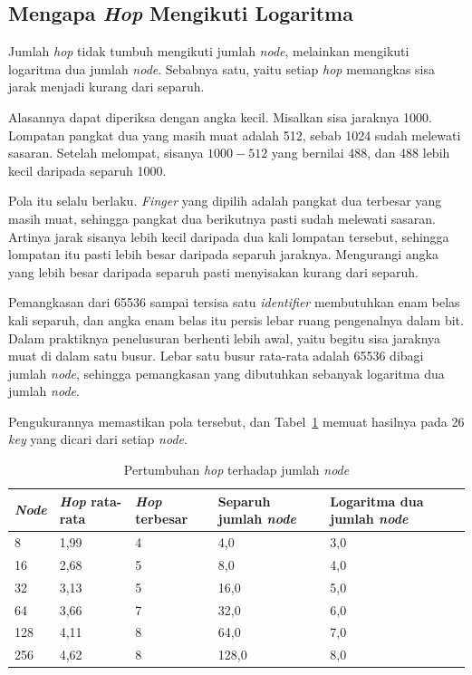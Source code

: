 \subsection{Mengapa \textit{Hop} Mengikuti Logaritma}

Jumlah \textit{hop} tidak tumbuh mengikuti jumlah \textit{node}, melainkan
mengikuti logaritma dua jumlah \textit{node}. Sebabnya satu, yaitu setiap
\textit{hop} memangkas sisa jarak menjadi kurang dari separuh.

Alasannya dapat diperiksa dengan angka kecil. Misalkan sisa jaraknya 1000.
Lompatan pangkat dua yang masih muat adalah 512, sebab 1024 sudah melewati
sasaran. Setelah melompat, sisanya $1000 - 512$ yang bernilai 488, dan 488 lebih
kecil daripada separuh 1000.

Pola itu selalu berlaku. \textit{Finger} yang dipilih adalah pangkat dua terbesar yang
masih muat, sehingga pangkat dua berikutnya pasti sudah melewati sasaran.
Artinya jarak sisanya lebih kecil daripada dua kali lompatan tersebut, sehingga
lompatan itu pasti lebih besar daripada separuh jaraknya. Mengurangi angka yang
lebih besar daripada separuh pasti menyisakan kurang dari separuh.

Pemangkasan dari 65536 sampai tersisa satu \textit{identifier} membutuhkan enam belas kali
separuh, dan angka enam belas itu persis lebar ruang pengenalnya dalam bit.
Dalam praktiknya penelusuran berhenti lebih awal, yaitu begitu sisa jaraknya
muat di dalam satu busur. Lebar satu busur rata-rata adalah 65536 dibagi jumlah
\textit{node}, sehingga pemangkasan yang dibutuhkan sebanyak logaritma dua
jumlah \textit{node}.

Pengukurannya memastikan pola tersebut, dan Tabel~\ref{tab:tumbuh-hop} memuat
hasilnya pada 26 \textit{key} yang dicari dari setiap \textit{node}.

\begin{table}[htbp]
  \centering
  \caption{Pertumbuhan \textit{hop} terhadap jumlah \textit{node}}
  \label{tab:tumbuh-hop}
  \begin{tabularx}{\textwidth}{|l|l|l|l|X|}
    \hline
    \textbf{\textit{Node}} & \textbf{\textit{Hop} rata-rata} & \textbf{\textit{Hop} terbesar} & \textbf{Separuh jumlah \textit{node}} & \textbf{Logaritma dua jumlah \textit{node}} \\
    \hline
    8 & 1,99 & 4 & 4,0 & 3,0 \\
    \hline
    16 & 2,68 & 5 & 8,0 & 4,0 \\
    \hline
    32 & 3,13 & 5 & 16,0 & 5,0 \\
    \hline
    64 & 3,66 & 7 & 32,0 & 6,0 \\
    \hline
    128 & 4,11 & 8 & 64,0 & 7,0 \\
    \hline
    256 & 4,62 & 8 & 128,0 & 8,0 \\
    \hline
  \end{tabularx}
\end{table}

